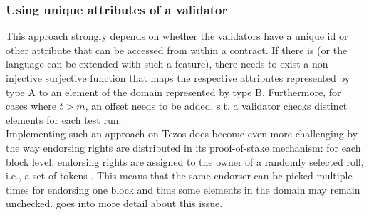 \subsubsection{Using unique attributes of a validator}\label{sec:alt_attributes}
This approach strongly depends on whether the validators have a unique id or other attribute that can be accessed from within a contract.  If there is (or the language can be extended with such a feature), there needs to exist a non-injective surjective function that maps the respective attributes represented by type A to an element of the domain represented by type B. Furthermore, for cases where $t > m$, an offset needs to be added, s.t. a validator checks distinct elements for each test run. \\
Implementing such an approach on Tezos does become even more challenging by the way endorsing rights are distributed in its proof-of-stake mechanism: for each block level, endorsing rights are assigned to the owner of a randomly selected roll, i.e., a set of tokens \cite{tezos_docs}. This means that the same endorser can be picked multiple times for endorsing one block and thus some elements in the domain may remain unchecked.  goes into more detail about this issue. 